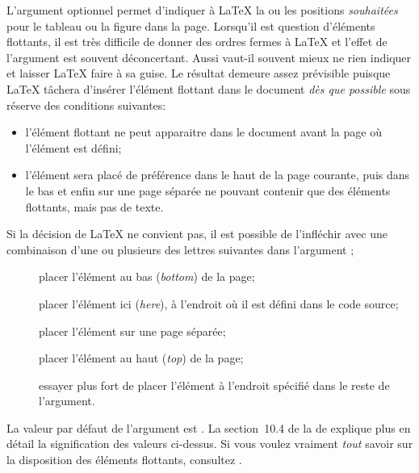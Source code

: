 L'argument optionnel  permet d'indiquer à {\LaTeX}
la ou les positions \emph{souhaitées} pour le tableau ou la figure dans la page.
Lorsqu'il est question d'éléments flottants, il est très difficile de donner des
ordres fermes à {\LaTeX} et l'effet de l'argument  est
souvent déconcertant. Aussi vaut-il souvent mieux ne rien indiquer et
laisser {\LaTeX} faire à sa guise. Le résultat demeure assez
prévisible puisque {\LaTeX} tâchera d'insérer l'élément flottant dans
le document \emph{dès que possible} sous réserve des conditions
suivantes:
\begin{itemize}
\item l'élément flottant ne peut apparaitre dans le document avant la
  page où l'élément est défini;
\item l'élément sera placé de préférence dans le haut de la page
  courante, puis dans le bas et enfin sur une page séparée ne pouvant
  contenir que des éléments flottants, mais pas de texte.
\end{itemize}

Si la décision de {\LaTeX} ne convient pas, il est possible de
l'infléchir avec une combinaison d'une ou plusieurs des lettres
suivantes dans l'argument ;
\begin{description}
\item[\normalfont{}] placer l'élément au bas (\emph{bottom}) de la page;
\item[\normalfont{}] placer l'élément ici (\emph{here}), à
  l'endroit où il est défini dans le code source;
\item[\normalfont{}] placer l'élément sur une page séparée;
\item[\normalfont{}] placer l'élément au haut (\emph{top}) de la page;
\item[\normalfont\code{!}] essayer plus fort de placer l'élément à
  l'endroit spécifié dans le reste de l'argument.
\end{description}
La valeur par défaut de l'argument  est . La
section~10.4 de la %
de  explique plus en détail la signification des valeurs
ci-dessus. Si vous voulez vraiment \emph{tout} savoir sur la
disposition des éléments flottants, consultez
\cite{Mittelbach:floats:2014}.

